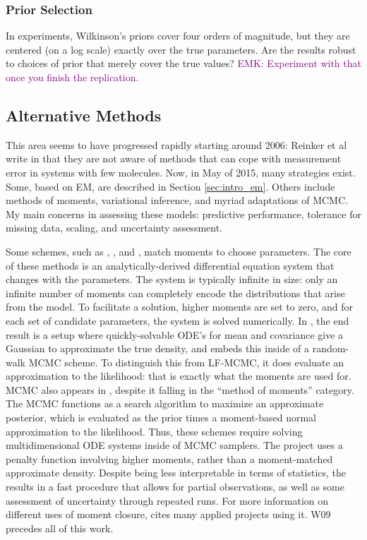 \documentclass{article}
\newcommand\EMK[1]{\textcolor{purple}{EMK: #1}}
\begin{document}
\subsubsection{Prior Selection}
In experiments, Wilkinson's priors cover four orders of magnitude, but they are centered (on a log scale) exactly over the true parameters. Are the results robust to choices of prior that merely cover the true values? \EMK{Experiment with that once you finish the replication.}

\subsection{Alternative Methods}
This area seems to have progressed rapidly starting around 2006: Reinker et al write in \cite{reinker2006parameter} that they are not aware of methods that can cope with measurement error in systems with few molecules. Now, in May of 2015, many strategies exist. Some, based on EM, are described in Section \ref{sec:intro_em}. Others include methods of moments, variational inference, and myriad adaptations of MCMC. My main concerns in assessing these models: predictive performance, tolerance for missing data, scaling, and uncertainty assessment.

Some schemes, such as \cite{milner2013moment}, \cite{kugler2012moment}, and \cite{zechner2012moment}, match moments to choose parameters. The core of these methods is an analytically-derived differential equation system that changes with the parameters. The system is typically infinite in size: only an infinite number of moments can completely encode the distributions that arise from the model. To facilitate a solution, higher moments are set to zero, and for each set of candidate parameters, the system is solved numerically. In \cite{milner2013moment}, the end result is a setup where quickly-solvable ODE's for mean and covariance give a Gaussian to approximate the true density, and \cite{milner2013moment} embeds this inside of a random-walk MCMC scheme. To distinguish this from LF-MCMC, it does evaluate an approximation to the likelihood: that is exactly what the moments are used for. MCMC also appears in \cite{zechner2012moment}, despite it falling in the ``method of moments'' category. The MCMC functions as a search algorithm to maximize an approximate posterior, which is evaluated as the prior times a moment-based normal approximation to the likelihood. Thus, these schemes require solving multidimensional ODE systems inside of MCMC samplers. The project  \cite{kugler2012moment} uses a penalty function involving higher moments, rather than a moment-matched approximate density. Despite being less interpretable in terms of statistics, the results in a fast procedure that allows for partial observations, as well as some assessment of uncertainty through repeated runs. For more information on different uses of moment closure, \cite{Milner201199} cites many applied projects using it. W09 precedes all of this work. 
\end{document}
